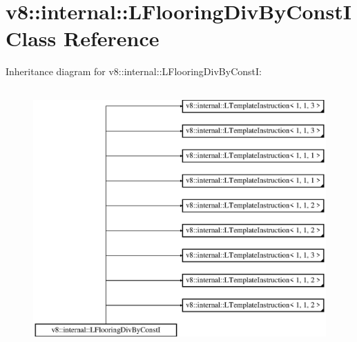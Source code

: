 \hypertarget{classv8_1_1internal_1_1_l_flooring_div_by_const_i}{}\section{v8\+:\+:internal\+:\+:L\+Flooring\+Div\+By\+ConstI Class Reference}
\label{classv8_1_1internal_1_1_l_flooring_div_by_const_i}
Inheritance diagram for v8\+:\+:internal\+:\+:L\+Flooring\+Div\+By\+ConstI\+:\begin{figure}[H]
\begin{center}
\leavevmode
\includegraphics[height=10.000000cm]{classv8_1_1internal_1_1_l_flooring_div_by_const_i}
\end{center}
\end{figure}
